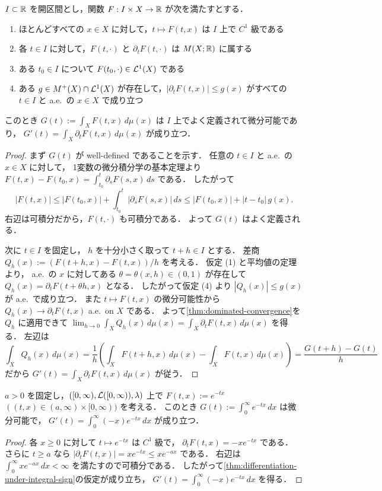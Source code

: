 \begin{theorem}[積分記号下の微分]\label{thm:differentiation-under-integral-sign}
$I \subset \mathbb R$ を開区間とし，関数 $F:I \times X \to \mathbb R$ が次を満たすとする．
\begin{enumerate}
    \item ほとんどすべての $x \in X$ に対して，$t \mapsto F(t,x)$ は $I$ 上で $C^1$ 級である
    \item 各 $t \in I$ に対して，$F(t,\cdot)$ と $\partial_tF(t,\cdot)$ は $M(X;\mathbb R)$ に属する
    \item ある $t_0 \in I$ について $F(t_0,\cdot)\in\mathcal L^1(X)$ である
    \item ある $g\in M^+(X)\cap\mathcal L^1(X)$ が存在して，$|\partial_tF(t,x)|\le g(x)$ がすべての $t \in I$ と a.e.\ の $x \in X$ で成り立つ
\end{enumerate}
このとき $G(t):=\int_X F(t,x)\,d\mu(x)$ は $I$ 上でよく定義されて微分可能であり，
$G'(t)=\int_X \partial_tF(t,x)\,d\mu(x)$ が成り立つ．
\end{theorem}
\begin{proof}
まず $G(t)$ が well-defined であることを示す．
任意の $t \in I$ と a.e.\ の $x \in X$ に対して，
1変数の微分積分学の基本定理より
$F(t,x)-F(t_0,x)=\int_{t_0}^t \partial_sF(s,x)\,ds$ である．
したがって
\[
|F(t,x)|
\le |F(t_0,x)|+\int_{t_0}^t |\partial_sF(s,x)|\,ds
\le |F(t_0,x)|+|t-t_0|\,g(x).
\]
右辺は可積分だから，$F(t,\cdot)$ も可積分である．
よって $G(t)$ はよく定義される．

次に $t \in I$ を固定し，
$h$ を十分小さく取って $t+h \in I$ とする．
差商 $Q_h(x):=(F(t+h,x)-F(t,x))/h$ を考える．
仮定 (1) と平均値の定理より，
a.e.\ の $x$ に対してある $\theta=\theta(x,h)\in(0,1)$ が存在して
$Q_h(x)=\partial_tF(t+\theta h,x)$ となる．
したがって仮定 (4) より $|Q_h(x)|\le g(x)$ が a.e.\ で成り立つ．
また $t \mapsto F(t,x)$ の微分可能性から $Q_h(x)\to \partial_tF(t,x)$ a.e.\ on $X$ である．
よって\cref{thm:dominated-convergence}を $Q_h$ に適用できて
$\lim_{h\to 0}\int_X Q_h(x)\,d\mu(x)=\int_X \partial_tF(t,x)\,d\mu(x)$ を得る．
左辺は
\[
\int_X Q_h(x)\,d\mu(x)
=\frac{1}{h}
\left(\int_X F(t+h,x)\,d\mu(x)-\int_X F(t,x)\,d\mu(x)\right)
=\frac{G(t+h)-G(t)}{h}
\]
だから $G'(t)=\int_X \partial_tF(t,x)\,d\mu(x)$ が従う．
\end{proof}

\begin{example}
$a>0$ を固定し，$([0,\infty),\mathcal L([0,\infty)),\lambda)$ 上で
$F(t,x):=e^{-tx}$ $((t,x)\in (a,\infty)\times[0,\infty))$ を考える．
このとき $G(t):=\int_0^{\infty}e^{-tx}\,dx$ は微分可能で，
$G'(t)=\int_0^{\infty}(-x)e^{-tx}\,dx$ が成り立つ．
\end{example}
\begin{proof}
各 $x\ge 0$ に対して $t\mapsto e^{-tx}$ は $C^1$ 級で，
$\partial_tF(t,x)=-xe^{-tx}$ である．
さらに $t\ge a$ なら
$|\partial_tF(t,x)|=xe^{-tx}\le xe^{-ax}$ である．
右辺は $\int_0^{\infty}xe^{-ax}\,dx<\infty$ を満たすので可積分である．
したがって\cref{thm:differentiation-under-integral-sign}の仮定が成り立ち，
$G'(t)=\int_0^{\infty}(-x)e^{-tx}\,dx$ を得る．
\end{proof}

